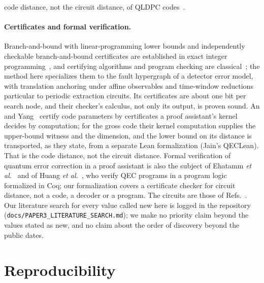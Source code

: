 \documentclass[aps,pra,twocolumn,superscriptaddress,nofootinbib,longbibliography,floatfix]{revtex4-2}
\begin{document}
code distance, not the circuit distance, of QLDPC codes~\cite{chen2026satqldpc}.

\paragraph*{Certificates and formal verification.} Branch-and-bound with linear-programming lower bounds and independently checkable branch-and-bound certificates are established in exact integer programming~\cite{cheung2017verifying,eifler2023computational}, and certifying algorithms and program checking are classical~\cite{mcconnell2011certifying,blumkannan1995}; the method here specializes them to the fault hypergraph of a detector error model, with translation anchoring under affine observables and time-window reductions particular to periodic extraction circuits. Its certificates are about one bit per search node, and their checker's calculus, not only its output, is proven sound. An and Yang~\cite{an2026certificate} certify code parameters by certificates a proof assistant's kernel decides by computation; for the gross code their kernel computation supplies the upper-bound witness and the dimension, and the lower bound on its distance is transported, as they state, from a separate Lean formalization (Jain's QECLean). That is the code distance, not the circuit distance. Formal verification of quantum error correction in a proof assistant is also the subject of Ehatamm \textit{et al.}~\cite{ehatamm2026end} and of Huang \textit{et al.}~\cite{huang2025veriqec}, who verify QEC programs in a program logic formalized in Coq; our formalization covers a certificate checker for circuit distance, not a code, a decoder or a program. The circuits are those of Refs.~\cite{bravyi2024high,strikis2026high,shaw2024lowering,shaw2026optimising}. Our literature search for every value called new here is logged in the repository (\texttt{docs/PAPER3\_LITERATURE\_SEARCH.md}); we make no priority claim beyond the values stated as new, and no claim about the order of discovery beyond the public dates.

\section{Reproducibility}
\label{sec:repro}
\end{document}
